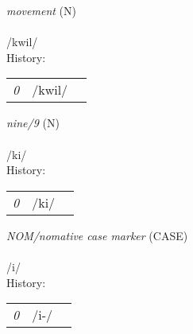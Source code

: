 \vspace{15pt}
\begin{nopagebreak}
 \textit{movement} (N)\\
\\
\noindent /kw{\textprimstress}il/\\


\noindent History:

\vspace{-0pt}
\hspace{40pt}
\begin{tabular}{ccc}
\textit{0} & /kwil/& \\
\end{tabular}

\vspace{20pt}\hline

\end{nopagebreak}
\filbreak



\vspace{15pt}
\begin{nopagebreak}
 \textit{nine/9} (N)\\
\\
\noindent /k{\textprimstress}i/\\


\noindent History:

\vspace{-0pt}
\hspace{40pt}
\begin{tabular}{ccc}
\textit{0} & /ki/& \\
\end{tabular}

\vspace{20pt}\hline

\end{nopagebreak}
\filbreak



\vspace{15pt}
\begin{nopagebreak}
 \textit{NOM/nomative case marker} (CASE)\\
\\
\noindent /{\textprimstress}i/\\


\noindent History:

\vspace{-0pt}
\hspace{40pt}
\begin{tabular}{ccc}
\textit{0} & /i-/& \\
\end{tabular}

\vspace{20pt}\hline

\end{nopagebreak}
\filbreak



